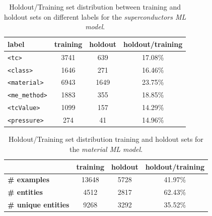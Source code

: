 \documentclass{article}
\begin{document}
\begin{table}[ht]
\centering\small
\begin{tabular}{lccc}
\toprule
label & \textbf{training}  & \textbf{holdout} & \textbf{holdout/training }     \\
\midrule
\texttt{<tc>}           & 3741      & 639   & 17.08\%   \\
\texttt{<class>}        & 1646      & 271   & 16.46\%   \\
\texttt{<material>}     & 6943      & 1649  & 23.75\%   \\
\texttt{<me\_method>}   & 1883      & 355   & 18.85\%   \\
\texttt{<tcValue>}      & 1099      & 157   & 14.29\%   \\
\texttt{<pressure>}     & 274       & 41    & 14.96\%   \\
\bottomrule

\end{tabular}

\caption{Holdout/Training set distribution between training and holdout sets on different labels for the \textit{superconductors ML model}.}
\label{tab:training-holdout-labels-distribution-annex}
\end{table}

\begin{table}[ht]
\centering\small
\begin{tabular}{lccc}
\toprule
& \textbf{training}  & \textbf{holdout} & \textbf{holdout/training}      \\
\midrule
\textbf{\# examples}        & 13648 & 5728  & 41.97\%   \\
\textbf{\# entities}        & 4512  & 2817  & 62.43\%   \\
\textbf{\# unique entities} & 9268  & 3292  & 35.52\%   \\
\bottomrule

\end{tabular}

\caption{Holdout/Training set distribution training and holdout sets for the \textit{material ML model}.}
\label{tab:training-holdout-set-distribution-annex}
\end{table}
\end{document}
